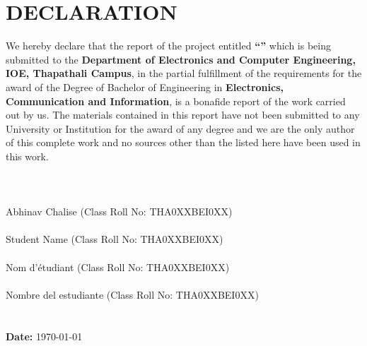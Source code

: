 \documentclass{ioereport}
\begin{document}





\coverpage{\titlename}{\authorlist}

\coverpageB{\titlename}{\authorlist}
\pagebreak

\section*{DECLARATION}
    We hereby declare that the report of the project entitled \textbf{“\titlename”} which is being submitted to the \textbf{Department of Electronics and Computer Engineering, IOE, Thapathali Campus}, in the partial fulfillment of the requirements for the award of the Degree of Bachelor of Engineering in \textbf{Electronics, Communication and Information}, is a bonafide report of the work carried out by us. The materials contained in this report have not been submitted to any University or Institution for the award of any degree and we are the only author of this complete work and no sources other than the listed here have been used in this work.
    \\ \\ \\ \\
    Abhinav Chalise (Class Roll No: THA0XXBEI0XX) \hrulefill \\ \\
    Student Name  (Class Roll No: THA0XXBEI0XX) \hrulefill \\ \\ 
    Nom d'étudiant (Class Roll No: THA0XXBEI0XX) \hrulefill \\ \\ 
    Nombre del estudiante (Class Roll No: THA0XXBEI0XX) \hrulefill \\ \\ \\ 
    \textbf{Date:} \today
    
\end{document}
